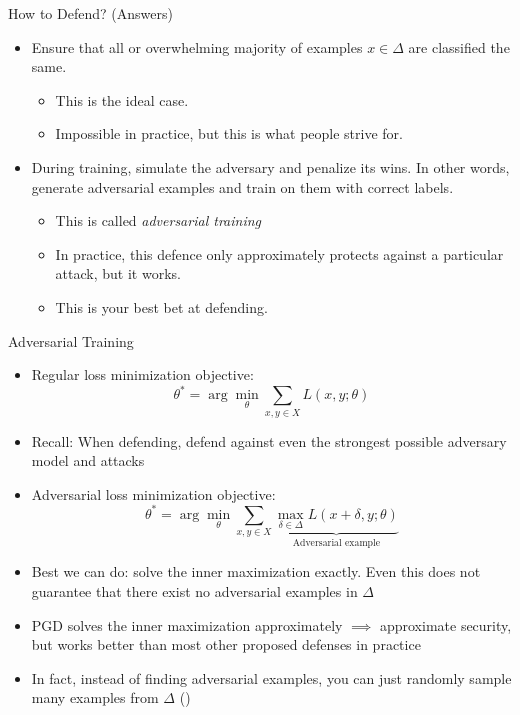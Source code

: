 \documentclass[10pt]{beamer}
\begin{document}
\begin{frame}{How to Defend? (Answers)}
  \begin{itemize}[<+->]
    \item Ensure that all or overwhelming majority of examples $x \in \Delta$ are classified
      the same.
      \begin{itemize}
        \item This is the ideal case.
        \item Impossible in practice, but this is what people strive for.
      \end{itemize}

    \item During training, simulate the adversary and penalize its wins. In other words, generate
      adversarial examples and train on them with correct labels.
      \begin{itemize}
        \item This is called \emph{adversarial training}
        \item In practice, this defence only approximately protects against a particular
          attack, but it works.
        \item This is your best bet at defending.
      \end{itemize}

  \end{itemize}

\end{frame}


\begin{frame}{Adversarial Training}
  \begin{itemize}[<+-| @alert+>]
    \item Regular loss minimization objective:
      \[
        \theta^* = \arg \min_\theta \sum_{x, y \in X} L(x, y; \theta)
      \]
    \item Recall: When defending, defend against even the strongest possible adversary model and
      attacks
    \item Adversarial loss minimization objective:
      \[
        \theta^* = \arg \min_\theta \sum_{x, y \in X} \underbrace{\max_{\delta \in \Delta}
        L(x + \delta, y; \theta)}_{\text{Adversarial example}}
      \]
    \item Best we can do: solve the inner maximization exactly. Even this does not guarantee that
        there exist no adversarial examples in $\Delta$
    \item PGD solves the inner maximization approximately $\implies$ approximate security, but works
      better than most other proposed defenses in practice
    \item In fact, instead of finding adversarial examples, you can just randomly sample many
      examples from $\Delta$ (\cite{CohenRK19})
  \end{itemize}
\end{frame}
\end{document}
